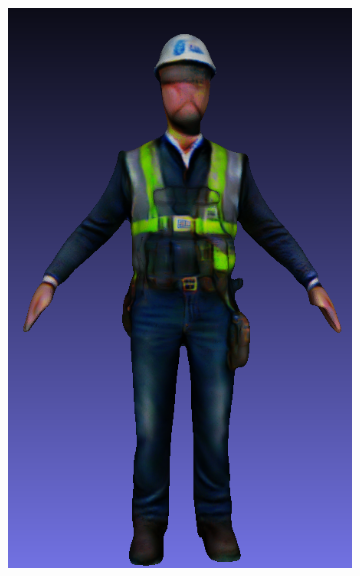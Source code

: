 \begin{figure}[H]
    \begin{subfigure}[b]{0.2\textwidth}
        \centering
        \includegraphics[width=\textwidth]{etc/bias/bias_engineer_genie_1.png}
        \caption{}
    \end{subfigure}
    \begin{subfigure}[b]{0.2567\textwidth}
        \centering

\end{subfigure}
\end{figure}
